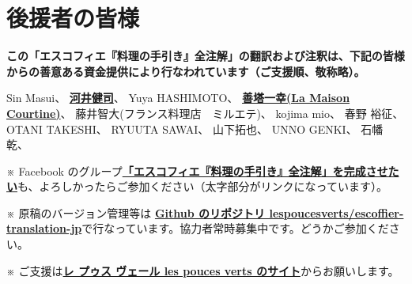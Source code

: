 \hypertarget{benefactors}{%
\section{後援者の皆様}\label{benefactors}}

\thispagestyle{empty}

\small

\textbf{この「エスコフィエ『料理の手引き』全注解」の翻訳および注釈は、下記の皆様からの善意ある資金提供により行なわれています（ご支援順、敬称略）。}

\normalsize
\vspace{1\zw}

Sin Masui、\href{20180524-23h,2x,novelsoundsmail@gmail.com}{}
\href{http://www.undecesjours.com/}{\textbf{河井健司}}、\href{20180525-0h14,10x,20180605-11h42,10x,kwibeng@gmail.com}{}
Yuya HASHIMOTO、\href{20180525-1h40,2x,hashimo0910@gmail.com}{}
\href{http://www.courtine.jp/}{\textbf{善塔一幸(La Maison
Courtine)}}、\href{20180525-8h56,10x,kazuyukizento120@docomo.ne.jp}{}
藤井智大(フランス料理店　ミルエテ)、\href{20180525-10h07,1x,apple19761019@yahoo.co.jp}{}
kojima mio、\href{20180525-12h23,1x,teeeeshow@yahoo.co.jp}{} 春野
裕征、\href{20180528-2h41,1x,amanojack.v-o-v@i.softbank.jp}{} OTANI
TAKESHI、\href{20180529-17h26,2x,1000feuille@ezweb.ne.jp}{} RYUUTA
SAWAI、\href{20180530-2h57.1x,rs.ajtk.zz@i.softbank.jp}{}
山下拓也、\href{20180605-11h04,5x,FB:Takuya\%20Yamashita}{} UNNO
GENKI、\href{20180605-22h12,1x,guriiva@aol.com}{}
石幡乾、\href{201806060-6h24,1x,zonek.gentile.bonheur.ken05@gmail.com}{}

\vfill

\small

※ Facebook
のグループ\href{https://www.facebook.com/groups/1548833425201180/}{\textbf{「エスコフィエ『料理の手引き』全注解」を完成させたい}}も、よろしかったらご参加ください（太字部分がリンクになっています）。

※ 原稿のバージョン管理等は
\href{https://github.com/lespoucesverts/escoffier-translation-jp}{\textbf{Github
のリポジトリ
lespoucesverts/escoffier-translation-jp}}で行なっています。協力者常時募集中です。どうかご参加ください。

※ ご支援は\href{https://lespoucesverts.org/archives/7042}{\textbf{レ
プゥス ヴェール les pouces verts のサイト}}からお願いします。
